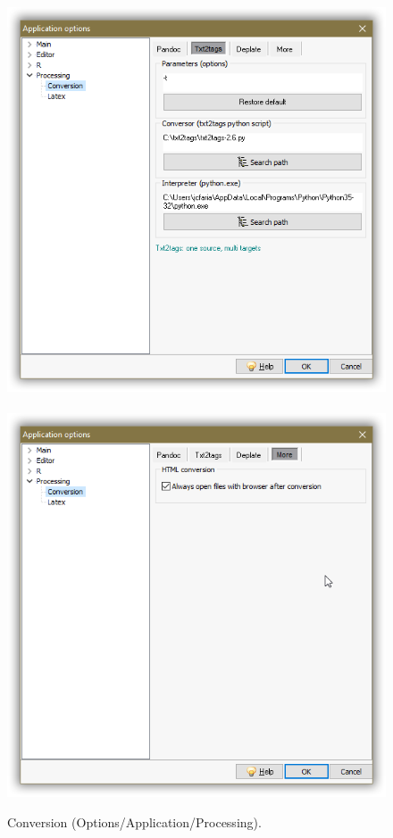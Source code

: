 \begin{figure}[h!]
  \includegraphics[scale=0.35]{./res/app_processing_conversion_txt2tags.png}~~
  \includegraphics[scale=0.35]{./res/app_processing_conversion_more.png}\\
  \caption{Conversion (Options/Application/Processing).}
  \label{fig:app_processing_conversion_options}
\end{figure}

